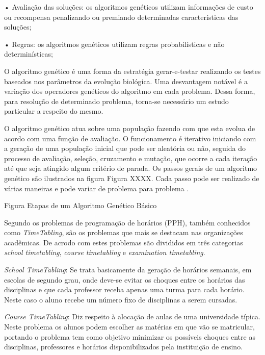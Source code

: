 •  Avaliação das soluções: os algoritmos genéticos utilizam informações de custo ou recompensa penalizando ou premiando determinadas características das soluções; \par

•  Regras: os algoritmos genéticos utilizam regras probabilísticas e não determinísticas; \par

O algoritmo genético é uma forma da estratégia gerar-e-testar realizando os testes baseados nos parâmetros da evolução biológica. Uma desvantagem notável é a variação dos operadores genéticos do algoritmo em cada problema. Dessa forma, para resolução de determinado problema, torna-se necessário um estudo particular a respeito do mesmo. \par

O algoritmo genético atua sobre uma população fazendo com que esta evolua de acordo com uma função de avaliação. O funcionamento é iterativo iniciando com a geração de uma população inicial que pode ser aleatória ou não, seguida do processo de avaliação, seleção, cruzamento e mutação, que ocorre a cada iteração até que seja atingido algum critério de parada. Os passos gerais de um algoritmo genético são ilustrados na figura 
Figura XXXX. Cada passo pode ser realizado de várias maneiras e pode variar de problema para problema \cite{timoteo2005desenvolvimento}.\par 

Figura Etapas de um Algoritmo Genético Básico 


Segundo \cite{kripkasimulated} os problemas de programação de horários (PPH), também conhecidos como \textit{TimeTabling}, são os problemas que mais se destacam nas organizações acadêmicas. De acrodo com \cite{schaerf1999survey} estes problemas são divididos em três categorias \textit{school timetabling}, \textit{course timetabling} e \textit{examination timetabling}.\par

\textit{School TimeTabling}: Se trata basicamente da geração de horários semanais, em escolas de segundo grau, onde deve-se evitar os choques entre os horários das disciplinas e que cada professor receba apenas uma turma para cada horário. Neste caso o aluno recebe um número fixo de disciplinas a serem cursadas.\par

\textit{Course TimeTabling}: Diz respeito à alocação de aulas de uma universidade típica. Neste problema os alunos podem escolher as matérias em que vão se matricular, portando o problema tem como objetivo minimizar os possíveis choques entre as disciplinas, professores e horários disponibilizados pela instituição de ensino.\par


